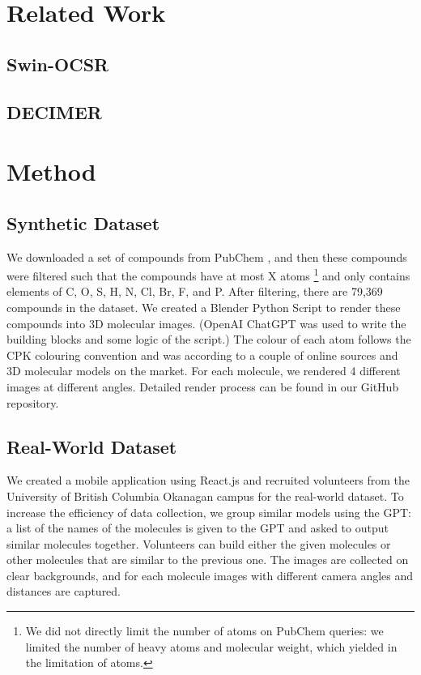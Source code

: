 \documentclass{article}
\begin{document}
\section{Related Work}
\subsection{Swin-OCSR}
\subsection{DECIMER}

\section{Method}
\subsection{Synthetic Dataset}
We downloaded a set of compounds from PubChem \cite{kim_pubchem_2023}, and then these compounds were filtered such that the compounds have at most X atoms \footnote{We did not directly limit the number of atoms on PubChem queries: we limited the number of heavy atoms and molecular weight, which yielded in the limitation of atoms.} and only contains elements of C, O, S, H, N, Cl, Br, F, and P.
After filtering, there are 79,369 compounds in the dataset. We created a Blender Python Script to render these compounds into 3D molecular images. (OpenAI ChatGPT was used to write the building blocks and some logic of the script.) The colour of each atom follows the CPK colouring convention and was according to a couple of online sources and 3D molecular models on the market. For each molecule, we rendered 4 different images at different angles. Detailed render process can be found in our GitHub repository. 
\subsection{Real-World Dataset}
We created a mobile application using React.js and recruited volunteers from the University of British Columbia Okanagan campus for the real-world dataset. To increase the efficiency of data collection, we group similar models using the GPT: a list of the names of the molecules is given to the GPT and asked to output similar molecules together. Volunteers can build either the given molecules or other molecules that are similar to the previous one. 
The images are collected on clear backgrounds, and for each molecule images with different camera angles and distances are captured.  
\end{document}
